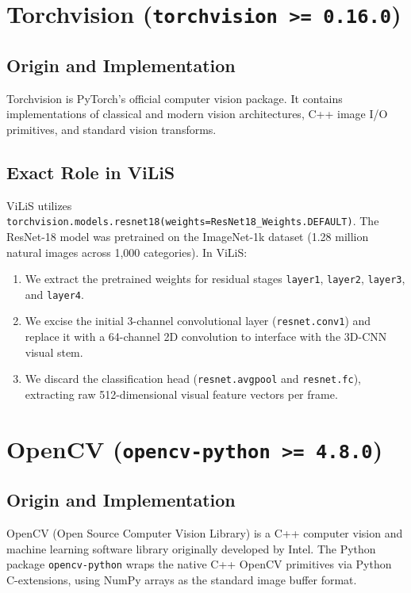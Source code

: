 \documentclass[11pt,a4paper]{report}
\begin{document}
\section{Torchvision (\texttt{torchvision >= 0.16.0})}
\subsection{Origin and Implementation}
Torchvision is PyTorch’s official computer vision package. It contains implementations of classical and modern vision architectures, C++ image I/O primitives, and standard vision transforms.
\subsection{Exact Role in ViLiS}
ViLiS utilizes \texttt{torchvision.models.resnet18(weights=ResNet18\_Weights.DEFAULT)}. 
The ResNet-18 model was pretrained on the ImageNet-1k dataset (1.28 million natural images across 1,000 categories). In ViLiS:
\begin{enumerate}
    \item We extract the pretrained weights for residual stages \texttt{layer1}, \texttt{layer2}, \texttt{layer3}, and \texttt{layer4}.
    \item We excise the initial 3-channel convolutional layer (\texttt{resnet.conv1}) and replace it with a 64-channel 2D convolution to interface with the 3D-CNN visual stem.
    \item We discard the classification head (\texttt{resnet.avgpool} and \texttt{resnet.fc}), extracting raw 512-dimensional visual feature vectors per frame.
\end{enumerate}

\section{OpenCV (\texttt{opencv-python >= 4.8.0})}
\subsection{Origin and Implementation}
OpenCV (Open Source Computer Vision Library) is a C++ computer vision and machine learning software library originally developed by Intel. The Python package \texttt{opencv-python} wraps the native C++ OpenCV primitives via Python C-extensions, using NumPy arrays as the standard image buffer format.
\end{document}
